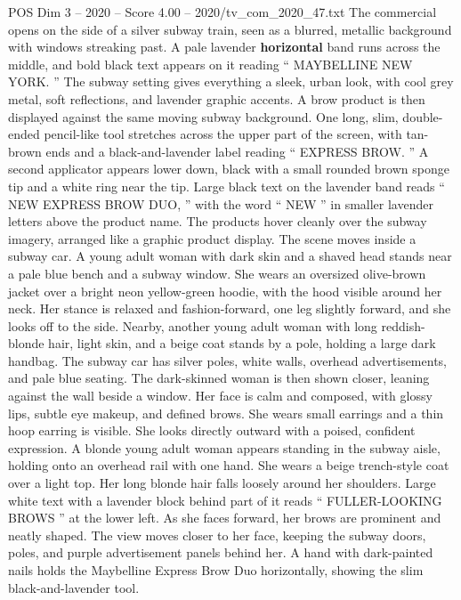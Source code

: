 \begin{textsample}{POS Dim 3 – 2020 – Score 4.00 – 2020/tv\_com\_2020\_47.txt}  \label{ex:f3_pos_077}
The commercial opens on the side of a silver subway train, seen as a blurred, metallic background with windows streaking past.
A pale lavender \textbf{horizontal} band runs across the middle, and bold black text appears on it reading “ MAYBELLINE NEW YORK. ” The subway setting gives everything a sleek, urban look, with cool grey metal, soft reflections, and lavender graphic accents.
A brow product is then displayed against the same moving subway background.
One long, slim, double-ended pencil-like tool stretches across the upper part of the screen, with tan-brown ends and a black-and-lavender label reading “ EXPRESS BROW. ” A second applicator appears lower down, black with a small rounded brown sponge tip and a white ring near the tip.
Large black text on the lavender band reads “ NEW EXPRESS BROW DUO, ” with the word “ NEW ” in smaller lavender letters above the product name.
The products hover cleanly over the subway imagery, arranged like a graphic product display.
The scene moves inside a subway car.
A young adult woman with dark skin and a shaved head stands near a pale blue bench and a subway window.
She wears an oversized olive-brown jacket over a bright neon yellow-green hoodie, with the hood visible around her neck.
Her stance is relaxed and fashion-forward, one leg slightly forward, and she looks off to the side.
Nearby, another young adult woman with long reddish-blonde hair, light skin, and a beige coat stands by a pole, holding a large dark handbag.
The subway car has silver poles, white walls, overhead advertisements, and pale blue seating.
The dark-skinned woman is then shown closer, leaning against the wall beside a window.
Her face is calm and composed, with glossy lips, subtle eye makeup, and defined brows.
She wears small earrings and a thin hoop earring is visible.
She looks directly outward with a poised, confident expression.
A blonde young adult woman appears standing in the subway aisle, holding onto an overhead rail with one hand.
She wears a beige trench-style coat over a light top.
Her long blonde hair falls loosely around her shoulders.
Large white text with a lavender block behind part of it reads “ FULLER-LOOKING BROWS ” at the lower left.
As she faces forward, her brows are prominent and neatly shaped.
The view moves closer to her face, keeping the subway doors, poles, and purple advertisement panels behind her.
A hand with dark-painted nails holds the Maybelline Express Brow Duo horizontally, showing the slim black-and-lavender tool.

\end{textsample}
